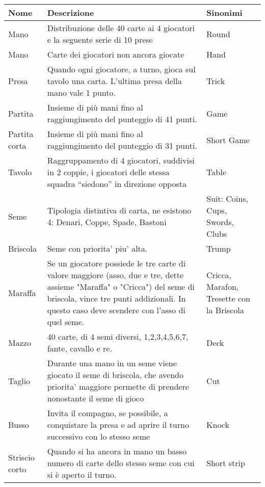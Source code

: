 \begin{table}[!ht]
    \centering
    \begin{adjustbox}{max width=1.1\textwidth,center}
    \begin{tabular}{|l|p{10cm}|l|}
    \hline
        Nome & Descrizione & Sinonimi \\ \hline
        Mano & Distribuzione delle 40 carte ai 4 giocatori e la seguente serie di 10 prese & Round \\ \hline
        Mano & Carte dei giocatori non ancora giocate & Hand \\ \hline
        Presa & Quando ogni giocatore, a turno, gioca sul tavolo una carta. L’ultima presa della mano vale 1 punto. & Trick \\ \hline
        Partita & Insieme di più mani fino al raggiungimento del punteggio di 41 punti. & Game \\ \hline
        Partita corta & Insieme di più mani fino al raggiungimento del punteggio di 31 punti. & Short Game \\ \hline
        Tavolo & Raggruppamento di 4 giocatori, suddivisi in 2 coppie, i giocatori delle stessa squadra “siedono” in direzione opposta & Table \\ \hline
        Seme & Tipologia distintiva di carta, ne esistono 4: Denari, Coppe, Spade, Bastoni & Suit: Coins, Cups, Swords, Clubs~ \\ \hline
        Briscola & Seme con priorita’ piu’ alta. & Trump \\ \hline
        Maraffa & Se un giocatore possiede le tre carte di valore maggiore (asso, due e tre, dette assieme "Maraffa" o "Cricca")
        del seme di briscola, vince tre punti addizionali. In questo caso deve scendere con l'asso di quel seme. & Cricca, Marafon, Tresette con la Briscola \\ \hline
        Mazzo & 40 carte, di 4 semi diversi, 1,2,3,4,5,6,7, fante, cavallo e re. & Deck \\ \hline
        Taglio & Durante una mano in un seme viene giocato il seme di briscola, che avendo priorita’ maggiore
        permette di prendere nonostante il seme di gioco & Cut \\ \hline
        Busso & Invita il compagno, se possibile, a conquistare la presa e ad aprire il turno successivo con lo stesso seme & Knock \\ \hline
        Striscio corto & Quando si ha ancora in mano un basso numero di carte dello stesso seme con cui si è aperto il turno. & Short strip \\ \hline

\end{tabular}
\end{adjustbox}
\end{table}
